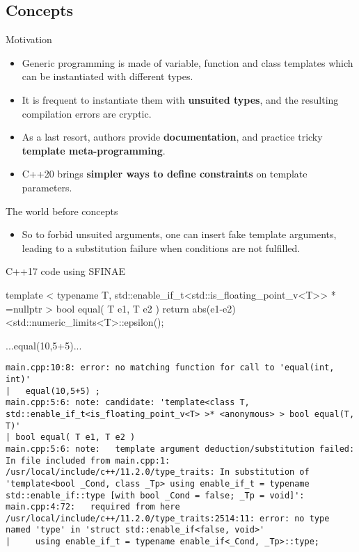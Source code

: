 \subsection[concepts]{Concepts}

\begin{frame}[fragile]
  \begin{block}{Motivation}
    \begin{itemize}
    \item Generic programming is made of variable, function and class templates which can be instantiated with different types.
    \item It is frequent to instantiate them with \textbf{unsuited types}, and the resulting compilation errors are cryptic.
    \item As a last resort, authors provide \textbf{documentation}, and practice tricky \textbf{template meta-programming}.
    \item C++20 brings \textbf{simpler ways to define constraints} on template parameters.
    \end{itemize}
  \end{block}
\end{frame}

\begin{frame}[fragile]
  \begin{block}{The world before concepts}
    \begin{itemize}
    \item So to forbid unsuited arguments, one can insert fake template arguments,
    leading to a substitution failure when conditions are not fulfilled.
    \end{itemize}
  \end{block}
  \begin{exampleblock}{C++17 code using SFINAE}
    \scriptsize
    \begin{cppcode*}{}
    template
    < typename T, std::enable_if_t<std::is_floating_point_v<T>> * =nullptr >
    bool equal( T e1, T e2 )
    { return abs(e1-e2)<std::numeric_limits<T>::epsilon(); }

    ...equal(10,5+5)...
    \end{cppcode*}
    \tiny
    \begin{verbatim}
main.cpp:10:8: error: no matching function for call to 'equal(int, int)'
|   equal(10,5+5) ;
main.cpp:5:6: note: candidate: 'template<class T, std::enable_if_t<is_floating_point_v<T> >* <anonymous> > bool equal(T, T)'
| bool equal( T e1, T e2 )
main.cpp:5:6: note:   template argument deduction/substitution failed:
In file included from main.cpp:1:
/usr/local/include/c++/11.2.0/type_traits: In substitution of 'template<bool _Cond, class _Tp> using enable_if_t = typename std::enable_if::type [with bool _Cond = false; _Tp = void]':
main.cpp:4:72:   required from here
/usr/local/include/c++/11.2.0/type_traits:2514:11: error: no type named 'type' in 'struct std::enable_if<false, void>'
|     using enable_if_t = typename enable_if<_Cond, _Tp>::type;
    \end{verbatim}
  \end{exampleblock}
\end{frame}

